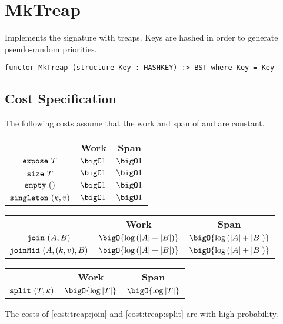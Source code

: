 \chapter{MkTreap}
\label{ch:treap-bst}
\begin{preamble}
Implements the  signature with treaps. Keys are hashed in order to
generate pseudo-random priorities.
\begin{verbatim}
functor MkTreap (structure Key : HASHKEY) :> BST where Key = Key
\end{verbatim}
\end{preamble}

\section{Cost Specification}

\begin{gram}
The following costs assume that the work and span of 
and  are constant.
\end{gram}

\begin{costspec}
\begin{tabular}{c|c|c}
& \textbf{Work} & \textbf{Span} \\
$\texttt{expose}~T$ & $\bigO 1$ & $\bigO 1$ \\
$\texttt{size}~T$ & $\bigO 1$ & $\bigO 1$ \\
$\texttt{empty}~()$ & $\bigO 1$ & $\bigO 1$ \\
$\texttt{singleton}~(k,v)$ & $\bigO 1$ & $\bigO 1$
\end{tabular}
\end{costspec}

\begin{costspec}[Join]
\label{cost:treap:join}
\begin{tabular}{c|c|c}
& \textbf{Work} & \textbf{Span} \\
$\texttt{join}~(A,B)$ & $\bigO {\log\left(|A| + |B|\right)}$ & $\bigO {\log\left(|A| + |B|\right)}$ \\
$\texttt{joinMid}~(A,(k,v),B)$ & $\bigO {\log\left(|A| + |B|\right)}$ & $\bigO {\log\left(|A| + |B|\right)}$
\end{tabular}
\end{costspec}

\begin{costspec}[Split]
\label{cost:treap:split}
\begin{tabular}{c|c|c}
& \textbf{Work} & \textbf{Span} \\
$\texttt{split}~(T,k)$ & $\bigO {\log|T|}$ & $\bigO {\log|T|}$
\end{tabular}
\end{costspec}

\begin{note}
The costs of \ref{cost:treap:join} and \ref{cost:treap:split} are with
high probability.
\end{note}

